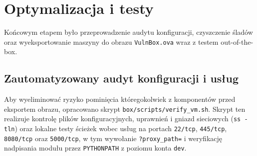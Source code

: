 \chapter{Optymalizacja i testy}
\label{chap:optymalizacja}

Końcowym etapem było przeprowadzenie audytu konfiguracji, czyszczenie śladów oraz wyeksportowanie maszyny do obrazu \texttt{VulnBox.ova} wraz z testem out-of-the-box.

\section{Zautomatyzowany audyt konfiguracji i usług}
\label{sec:verify-vm}

Aby wyeliminować ryzyko pominięcia któregokolwiek z komponentów przed eksportem obrazu, opracowano skrypt \texttt{box/scripts/verify\_vm.sh}. Skrypt ten realizuje kontrolę plików konfiguracyjnych, uprawnień i gniazd sieciowych (\texttt{ss -tln}) oraz lokalne testy ścieżek wobec usług na portach \texttt{22/tcp}, \texttt{445/tcp}, \texttt{8080/tcp} oraz \texttt{5000/tcp}, w tym wywołanie \texttt{?proxy\_path=} i weryfikację nadpisania modułu przez \texttt{PYTHONPATH} z poziomu konta \texttt{dev}.

